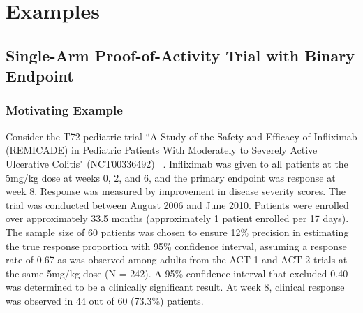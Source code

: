 \documentclass[useAMS,usenatbib,referee]{biom}
\begin{document}
\section{Examples}\label{sec:examples}

\subsection{Single-Arm Proof-of-Activity Trial with Binary Endpoint}\label{sec:example1}
\subsubsection{Motivating Example}
Consider the T72 pediatric trial ``A Study of the Safety and Efficacy of Infliximab (REMICADE) in Pediatric Patients With Moderately to Severely Active Ulcerative Colitis" (NCT00336492) ~\citep{Hyams2012}. Infliximab was given to all patients at the 5mg/kg dose at weeks 0, 2, and 6, and the primary endpoint was response at week 8. Response was measured by improvement in disease severity scores. The trial was conducted between August 2006 and June 2010. Patients were enrolled over approximately 33.5 months (approximately 1 patient enrolled per 17 days). The sample size of 60 patients was chosen to ensure 12\% precision in estimating the true
response proportion with 95\% confidence interval, assuming a response rate of 0.67 as was observed among adults from the ACT 1 and ACT 2 trials \citep{Rutgeerts2005} at the same 5mg/kg dose (N = 242). A 95\% confidence interval that excluded 0.40 was determined to be a clinically significant result. At week 8, clinical response was observed in 44 out of 60 (73.3\%) patients.
\end{document}
